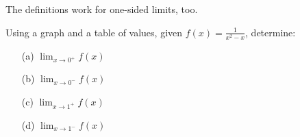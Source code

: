 \documentclass[cal1spr16Lectures.tex]{subfiles}
\begin{document}
\begin{frame}\footnotesize
The definitions work for one-sided limits, too.  

\vspace{1.5pc}
\begin{exe} Using a graph and a table of values, given $f(x)=\displaystyle\frac{1}{x^2-x}$, determine:
\begin{itemize}
\item[(a)\;] $\displaystyle\lim_{x \to 0^+} f(x)$
\item[(b)\;] $\displaystyle\lim_{x \to 0^-} f(x)$
\item[(c)\;] $\displaystyle\lim_{x \to 1^+} f(x)$
\item[(d)\;] $\displaystyle\lim_{x \to 1^-} f(x)$ 
\end{itemize}
\end{exe}
\end{frame}
\end{document}

